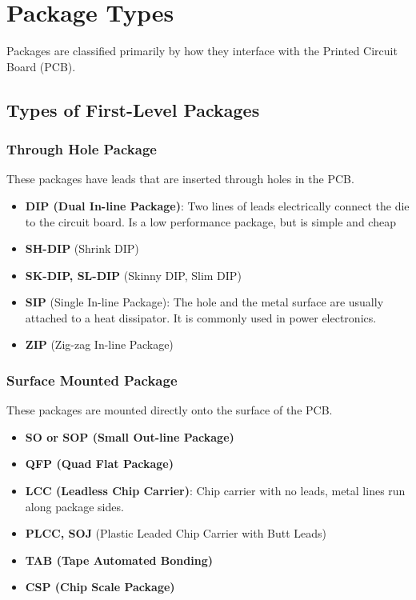 \documentclass{report}
\begin{document}
\section{Package Types}

Packages are classified primarily by how they interface with the Printed Circuit Board (PCB).

\subsection{Types of First-Level Packages}

\subsubsection{Through Hole Package}
These packages have leads that are inserted through holes in the PCB. 
\begin{itemize}
    \item \textbf{DIP (Dual In-line Package)}: Two lines of leads electrically connect the die to the circuit board. Is a low performance package, but is simple and cheap
    \item \textbf{SH-DIP} (Shrink DIP)
    \item \textbf{SK-DIP, SL-DIP} (Skinny DIP, Slim DIP)
    \item \textbf{SIP} (Single In-line Package): The hole and the metal surface are usually attached to a heat dissipator. It is commonly used in power electronics.
    \item \textbf{ZIP} (Zig-zag In-line Package)
\end{itemize}

\subsubsection{Surface Mounted Package}
These packages are mounted directly onto the surface of the PCB.
\begin{itemize}
    \item \textbf{SO or SOP (Small Out-line Package)}
    \item \textbf{QFP (Quad Flat Package)}
    \item \textbf{LCC (Leadless Chip Carrier)}: Chip carrier with no leads, metal lines run along package sides.
    \item \textbf{PLCC, SOJ} (Plastic Leaded Chip Carrier with Butt Leads)
    \item \textbf{TAB (Tape Automated Bonding)}
    \item \textbf{CSP (Chip Scale Package)}
\end{itemize}
\end{document}
